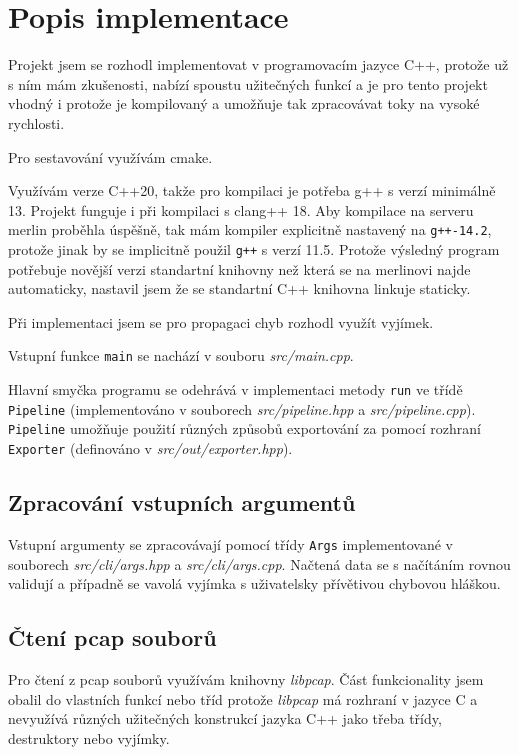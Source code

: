 \documentclass{article}
\begin{document}
\section{Popis implementace}
Projekt jsem se rozhodl implementovat v programovacím jazyce C++, protože už s
ním mám zkušenosti, nabízí spoustu užitečných funkcí a je pro tento projekt
vhodný i protože je kompilovaný a umožňuje tak zpracovávat toky na vysoké
rychlosti.

Pro sestavování využívám cmake.

Využívám verze C++20, takže pro kompilaci je potřeba g++ s verzí minimálně 13.
Projekt funguje i při kompilaci s clang++ 18. Aby kompilace na serveru merlin
proběhla úspěšně, tak mám kompiler explicitně nastavený na \verb|g++-14.2|,
protože jinak by se implicitně použil \verb|g++| s verzí 11.5. Protože výsledný
program potřebuje novější verzi standartní knihovny než která se na merlinovi
najde automaticky, nastavil jsem že se standartní C++ knihovna linkuje
staticky.

Při implementaci jsem se pro propagaci chyb rozhodl využít vyjímek.

Vstupní funkce \verb|main| se nachází v souboru \textit{src/main.cpp}.

Hlavní smyčka programu se odehrává v implementaci metody \verb|run| ve třídě
\verb|Pipeline| (implementováno v souborech \textit{src/pipeline.hpp} a
\textit{src/pipeline.cpp}). \verb|Pipeline| umožňuje použití různých způsobů
exportování za pomocí rozhraní \verb|Exporter| (definováno v
\textit{src/out/exporter.hpp}).

\subsection{Zpracování vstupních argumentů}
Vstupní argumenty se zpracovávají pomocí třídy \verb|Args| implementované v
souborech \textit{src/cli/args.hpp} a \textit{src/cli/args.cpp}. Načtená data
se s načítáním rovnou validují a případně se vavolá vyjímka s uživatelsky
přívětivou chybovou hláškou.

\subsection{Čtení pcap souborů}
Pro čtení z pcap souborů využívám knihovny \textit{libpcap}. Část funkcionality
jsem obalil do vlastních funkcí nebo tříd protože \textit{libpcap} má rozhraní
v jazyce C a nevyužívá různých užitečných konstrukcí jazyka C++ jako třeba
třídy, destruktory nebo vyjímky.
\end{document}
